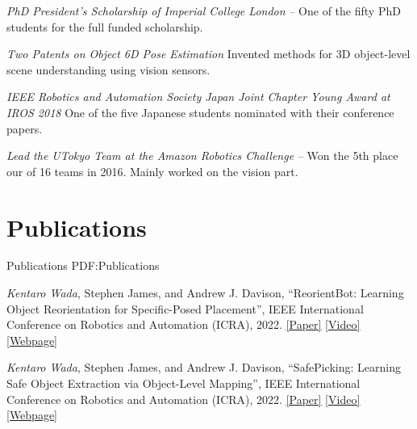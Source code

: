 \documentclass[letterpaper,MMMyyyy,nonstop]{simpleresumecv}
\begin{document}
\begin{body}
\BigGapNoBreak

\textit{PhD President's Scholarship of Imperial College London}
\hfill
{\it {} -- }
\newline
One of the fifty PhD students for the full funded scholarship.

\BigGapNoBreak

\textit{Two Patents on Object 6D Pose Estimation}
\hfill
{\it {}}
\newline
Invented methods for 3D object-level scene understanding using vision sensors.

\BigGapNoBreak

\textit{IEEE Robotics and Automation Society Japan Joint Chapter Young Award at IROS 2018}
\hfill
{\it {}}
\newline
One of the five Japanese students nominated with their conference papers.

\BigGapNoBreak

\textit{Lead the UTokyo Team at the Amazon Robotics Challenge}
\hfill
{\it {} -- }
\newline
Won the 5th place our of 16 teams in 2016. Mainly worked on the vision part.



\BigGapNoBreak

\section
{Publications}
{Publications}
{PDF:Publications}

\textit{Kentaro Wada}, Stephen James, and Andrew J. Davison,
``ReorientBot: Learning Object Reorientation for Specific-Posed Placement'',
IEEE International Conference on Robotics and Automation (ICRA), 2022.
\href{https://arxiv.org/abs/2202.11092}{\underline{[Paper]}}
\href{https://youtu.be/ahWN84sWWJU}{\underline{[Video]}}
\href{https://reorientbot.wkentaro.com}{\underline{[Webpage]}}

\BigGapNoBreak

\textit{Kentaro Wada}, Stephen James, and Andrew J. Davison,
``SafePicking: Learning Safe Object Extraction via Object-Level Mapping'',
IEEE International Conference on Robotics and Automation (ICRA), 2022.
\href{https://arxiv.org/abs/2202.05832}{\underline{[Paper]}}
\href{https://youtu.be/ejjqiBqRRKo}{\underline{[Video]}}
\href{https://safepicking.wkentaro.com}{\underline{[Webpage]}}


\end{body}
\end{document}

